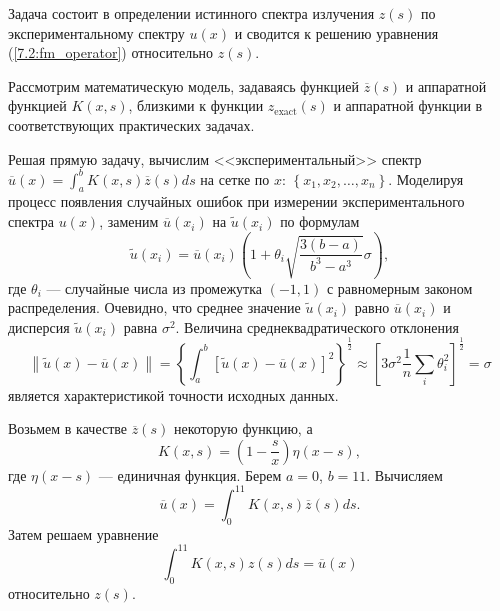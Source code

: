 \documentclass[12pt]{article}
\newcommand{\norm}[1]{\left\| #1 \right\|}
\begin{document}
	Задача состоит в определении истинного спектра излучения $z\left(s\right)$ по экспериментальному спектру $u\left(x\right)$ и сводится к решению уравнения (\ref{7.2:fm_operator}) относительно $z\left(s\right)$.
	
	Рассмотрим математическую модель, задаваясь функцией $\overline{z}\left(s\right)$ и аппаратной функцией $K\left(x,s\right)$, близкими к функции $z_{\text{exact}}\left(s\right)$ и аппаратной функции в соответствующих практических задачах.
	
	Решая прямую задачу, вычислим <<экспериментальный>> спектр $\overline{u}\left(x\right)=\int_{a}^{b}K\left(x,s\right)\overline{z}\left(s\right)ds$ на сетке по $x$: $\left\{x_1,x_2,\ldots,x_n\right\}$. Моделируя процесс появления случайных ошибок при измерении экспериментального спектра $u\left(x\right)$, заменим $\overline{u}\left(x_i\right)$ на $\tilde{u}\left(x_i\right)$ по формулам
	\begin{equation}
		\tilde{u}\left(x_i\right)=\overline{u}\left(x_i\right)\left(1+\theta_i \sqrt{\frac{3\left(b-a\right)}{b^3 - a^3}}\sigma\right),
	\end{equation}
	где $\theta_i$ --- случайные числа из промежутка $\left(-1,1\right)$ с равномерным законом распределения. Очевидно, что среднее значение $\tilde{u}\left(x_i\right)$ равно $\overline{u}\left(x_i\right)$ и дисперсия $\tilde{u}\left(x_i\right)$ равна $\sigma^2$. Величина среднеквадратического отклонения
	\begin{equation}
		\norm{\tilde{u}\left(x\right)-\overline{u}\left(x\right)}=\left\{\int_{a}^{b}\left[\tilde{u}\left(x\right)-\overline{u}\left(x\right)\right]^2\right\}^{\frac{1}{2}}\approx \left[3\sigma^2 \frac{1}{n}\sum_{i}\theta_i^2\right]^{\frac{1}{2}}=\sigma
	\end{equation}
	является характеристикой точности исходных данных.
	
	Возьмем в качестве $\overline{z}\left(s\right)$  некоторую функцию, а $$K\left(x,s\right)=\left(1-\frac{s}{x}\right)\eta\left(x-s\right),$$ где $\eta\left(x-s\right)$ --- единичная функция. Берем $a=0$, $b=11$.
	Вычисляем
	\begin{equation}
		\overline{u}\left(x\right)=\int_{0}^{11}K\left(x,s\right)\overline{z}\left(s\right)ds.
	\end{equation}
	Затем решаем уравнение
	\begin{equation}
		\int_{0}^{11}K\left(x,s\right)z\left(s\right)ds=\overline{u}\left(x\right)
	\end{equation}
	относительно $z\left(s\right)$.
	
\end{document}
